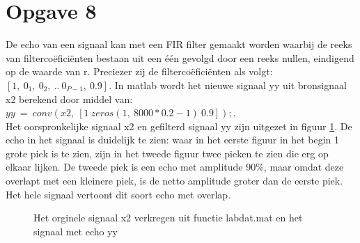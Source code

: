 \documentclass{article}
\begin{document}
\newpage
\section{Opgave 8}
De echo van een signaal kan met een FIR filter gemaakt worden waarbij de reeks
van filterco\"efici\"enten bestaan uit een \'e\'en gevolgd door een reeks
nullen, eindigend op de waarde van r. Preciezer zij de filterco\"efici\"enten
als volgt: $[1,~0_1,~0_2,~..~0_{P-1},~0.9]$. In matlab wordt het nieuwe
signaal yy uit bronsignaal x2 berekend door middel van:
$yy~=~conv(x2,~[1~zeros(1,~8000*0.2-1)~0.9]);$.\\

Het oorspronkelijke signaal x2 en gefilterd signaal yy zijn uitgezet in figuur
\ref{fig:opgave8}. De echo in het signaal is duidelijk te zien: waar in het
eerste figuur in het begin 1 grote piek is te zien, zijn in het tweede figuur
twee pieken te zien die erg op elkaar lijken. De tweede piek is een echo met
amplitude 90\%, maar omdat deze overlapt met een kleinere piek, is de netto
amplitude groter dan de eerste piek. Het hele signaal vertoont dit soort echo
met overlap.

\begin{figure}[h]
  \centering
  \caption{Het orginele signaal x2 verkregen uit functie labdat.mat en het signaal met echo yy}
  \label{fig:opgave8}
\end{figure}
\end{document}
